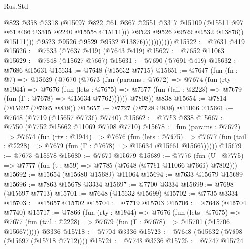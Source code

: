\begin{lexlean}{RustStd}
\begin{coremodule}
                                      @823
                                      @368
                                      @3318
                                      (@15097
                                        @822
                                        @61
                                        @367
                                        @2551
                                        @3317
                                        @15109
                                        (@15511 @97 @61 @66 @3315 @2240 @15558 @15111)))
                                    @9523
                                    @9526
                                    @9529
                                    @9532
                                    @13876))
                                @15111)))
                          @9523
                          @9526
                          @9529
                          @9532
                          @13876)))))))))))
@15622 := @7631 @419
@15626 := @7633 (@7637 @419) (@7643 @419)
@15627 := @7652 @11063
@15629 := @7648 (@15627 @7667)
@15631 := @7690 (@7691 @419)
@15632 := @7686 @15631
@15634 := @7648 (@15632 @7715)
@15651 := @7647
    (fun (fn : @7) =>
    @15629
      (@7670
        (@7673
          (fun (params : @7672) =>
          @7674
            (fun (rty : @1944) =>
            @7676
              (fun (lets : @7675) =>
              @7677 (fun (tail : @2228) => @7679 (fun (Γ : @7678) => @15634 @7762))))))
        @7808))
    @838
@15654 := @7814 (@15627 (@7665 @838))
@15657 := @7727 (@7728 @838) @11066
@15661 := @7648 (@7719 (@15657 @7736) @7740)
@15662 := @7753 @838
@15667 := @7750 (@7752 @15662 @11069 @7708 @7710)
@15678 := fun (params : @7672) =>
  @7674
    (fun (rty : @1944) =>
    @7676
      (fun (lets : @7675) =>
      @7677 (fun (tail : @2228) => @7679 (fun (Γ : @7678) => @15634 (@15661 @15667)))))
@15679 := @7673 @15678
@15680 := @7670 @15679
@15689 := @7776
    (fun (U : @7775) => @7777 (fun (t : @59) => @7785 (@7648 (@7791 @11066 @7666) @7802)))
@15692 := @15654 (@15680 @15689) @11064
@15694 := @7633 @15679 @15689
@15696 := @7863 @15678 @3334
@15697 := @7700 @3334
@15699 := @7698 (@15697 @7713)
@15701 := @7648 (@15632 @15699)
@15702 := @7735 @3334
@15703 := @15657 @15702
@15704 := @7719 @15703
@15706 := @7648 (@15704 @7740)
@15717 := @7866
    (fun (rty : @1944) =>
    @7676
      (fun (lets : @7675) =>
      @7677 (fun (tail : @2228) => @7679 (fun (Γ : @7678) => @15701 (@15706 @15667)))))
    @3336
@15718 := @7704 @3336
@15723 := @7648 (@15632 (@7698 (@15697 (@15718 @7712))))
@15724 := @7748 @3336
@15725 := @7747 @15724

\end{coremodule}
\end{lexlean}

